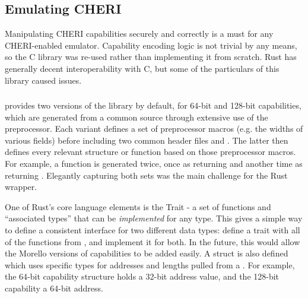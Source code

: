 \subsection{Emulating CHERI}

Manipulating CHERI capabilities securely and correctly is a must for any CHERI-enabled emulator.
Capability encoding logic is not trivial by any means, so the  C library was re-used rather than implementing it from scratch.
Rust has generally decent interoperability with C, but some of the particulars of this library caused issues.

\subsubsection{}
 provides two versions of the library by default, for 64-bit and 128-bit capabilities, which are generated from a common source through extensive use of the preprocessor.
Each variant defines a set of preprocessor macros (e.g. the widths of various fields) before including two common header files  and .
The latter then defines every relevant structure or function based on those preprocessor macros.
For example, a function  is generated twice, once as   returning  and another time as  returning .
Elegantly capturing both sets was the main challenge for the Rust wrapper.


One of Rust's core language elements is the Trait - a set of functions and \enquote{associated types} that can be \emph{implemented} for any type.
This gives a simple way to define a consistent interface for two different data types: define a trait  with all of the functions from , and implement it for both.
In the future, this would allow the Morello versions of capabilities to be added easily.
A struct  is also defined which uses specific types for addresses and lengths pulled from a .
For example, the 64-bit capability structure holds a 32-bit address value, and the 128-bit capability a 64-bit address.

